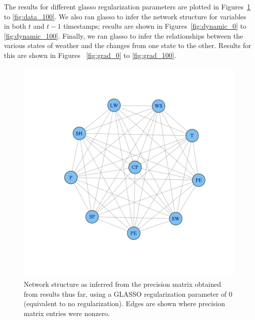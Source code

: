 \documentclass{article}
\begin{document}
The results for different glasso regularization parameters are plotted in
Figures~\ref{fig:data_0} to \ref{fig:data_100}. We also ran glasso to infer the
network structure for variables in both $t$ and $t - 1$ timestamps; results are
shown in Figures~\ref{fig:dynamic_0} to \ref{fig:dynamic_100}. Finally, we ran
glasso to infer the relationships between the various states of weather and the
changes from one state to the other. Results for this are shown in Figures~
\ref{fig:grad_0} to \ref{fig:grad_100}.

\begin{figure}
\includegraphics[width=0.9\columnwidth]{images/data_0.png}
\caption{Network structure as inferred from the precision matrix obtained from results thus far, using a GLASSO regularization parameter of 0 (equivalent to no regularization). Edges are shown where precision matrix entries were nonzero.}
\label{fig:data_0}
\end{figure}
\end{document}
